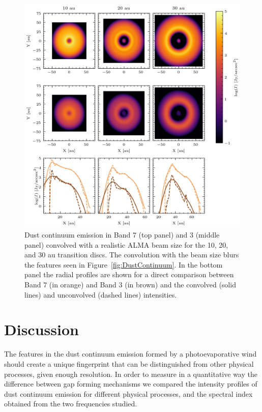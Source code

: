 \documentclass[fleqn,usenatbib]{mnras}
\begin{document}
        \begin{figure}
          \centering
          \includegraphics[width=\textwidth]{Fig5}
          \caption{Dust continuum emission in Band 7 (top panel) and 3 (middle panel) convolved with a realistic ALMA beam size for the 10, 20, and 30 au transition discs. The convolution with the beam size blurs the features seen in Figure~\ref{fig:DustContinuum}. In the bottom panel the radial profiles are shown for a direct comparison between Band 7 (in orange) and Band 3 (in brown) and the convolved (solid lines) and unconvolved (dashed lines) intensities.}
          \label{fig:comp_beam}
        \end{figure}

\section{Discussion} \label{sec:discussion}
    The features in the dust continuum emission formed by a photoevaporative wind should create a unique fingerprint that can be distinguished from other physical processes, given enough resolution.
    In order to measure in a quantitative way the difference between gap forming mechanisms we compared the intensity profiles of dust continuum emission for different physical processes, and the spectral index obtained from the two frequencies studied.
\end{document}
